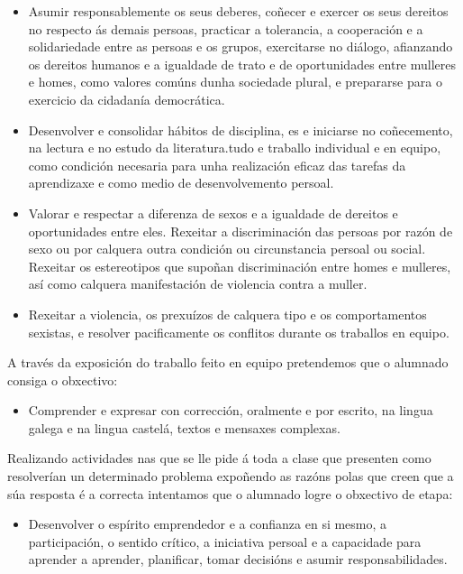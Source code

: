 \begin{itemize}
    \item Asumir responsablemente os seus deberes, coñecer e exercer os seus dereitos no respecto ás demais persoas, practicar a tolerancia, a cooperación e a solidariedade entre as persoas e os grupos, exercitarse no diálogo, afianzando os dereitos humanos e a igualdade de trato e de oportunidades entre mulleres e homes, como valores comúns dunha sociedade plural, e prepararse para o exercicio da cidadanía democrática.

    \item Desenvolver e consolidar hábitos de disciplina, es e iniciarse no coñecemento, na lectura e no estudo da literatura.tudo e traballo individual e en equipo, como condición necesaria para unha realización eficaz das tarefas da aprendizaxe e como medio de desenvolvemento persoal.

    \item Valorar e respectar a diferenza de sexos e a igualdade de dereitos e oportunidades entre eles. Rexeitar a discriminación das persoas por razón de sexo ou por calquera outra condición ou circunstancia persoal ou social. Rexeitar os estereotipos que supoñan discriminación entre homes e mulleres, así como calquera manifestación de violencia contra a muller.

    \item Rexeitar a violencia, os prexuízos de calquera tipo e os comportamentos sexistas, e resolver pacificamente os conflitos durante os traballos en equipo.
\end{itemize}

A través da exposición do traballo feito en equipo pretendemos que o alumnado consiga o obxectivo:

\begin{itemize}
    \item Comprender e expresar con corrección, oralmente e por escrito, na lingua galega e na lingua castelá, textos e mensaxes complexas.
\end{itemize}

Realizando actividades nas que se lle pide á toda a clase que presenten como resolverían un determinado problema expoñendo as razóns polas que creen que a súa resposta é a correcta intentamos que o alumnado logre o obxectivo de etapa:
\begin{itemize}
    \item Desenvolver o espírito emprendedor e a confianza en si mesmo, a participación, o sentido crítico, a iniciativa persoal e a capacidade para aprender a aprender, planificar, tomar decisións e asumir responsabilidades.
\end{itemize}

